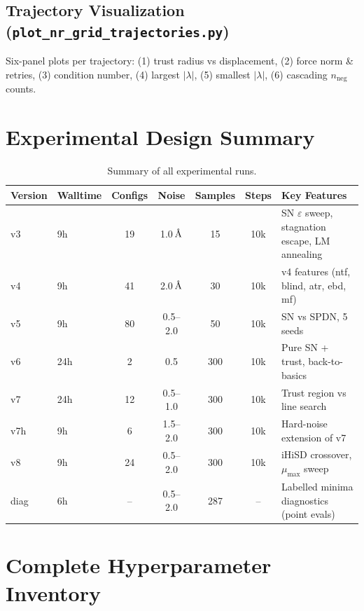 \documentclass[11pt,a4paper]{article}
\newcommand{\eval}{\lambda}
\newcommand{\angstrom}{\text{\r{A}}}
\begin{document}
\subsection{Trajectory Visualization (\texttt{plot\_nr\_grid\_trajectories.py})}

Six-panel plots per trajectory: (1) trust radius vs displacement, (2) force norm \& retries, (3) condition number, (4) largest $|\eval|$, (5) smallest $|\eval|$, (6) cascading $n_\text{neg}$ counts.

\section{Experimental Design Summary}
\label{sec:experiments}

\begin{table}[H]
\centering
\caption{Summary of all experimental runs.}
\label{tab:experiments}
\small
\begin{tabular}{llccccp{4cm}}
\toprule
Version & Walltime & Configs & Noise & Samples & Steps & Key Features \\
\midrule
v3 & 9h & 19 & 1.0\,$\angstrom$ & 15 & 10k & SN $\varepsilon$ sweep, stagnation escape, LM annealing \\
v4 & 9h & 41 & 2.0\,$\angstrom$ & 30 & 10k & v4 features (ntf, blind, atr, ebd, mf) \\
v5 & 9h & 80 & 0.5--2.0 & 50 & 10k & SN vs SPDN, 5 seeds \\
v6 & 24h & 2 & 0.5 & 300 & 10k & Pure SN + trust, back-to-basics \\
v7 & 24h & 12 & 0.5--1.0 & 300 & 10k & Trust region vs line search \\
v7h & 9h & 6 & 1.5--2.0 & 300 & 10k & Hard-noise extension of v7 \\
v8 & 9h & 24 & 0.5--2.0 & 300 & 10k & iHiSD crossover, $\mu_\text{max}$ sweep \\
diag & 6h & -- & 0.5--2.0 & 287 & -- & Labelled minima diagnostics (point evals) \\
\bottomrule
\end{tabular}
\end{table}

\section{Complete Hyperparameter Inventory}
\label{sec:params}
\end{document}
